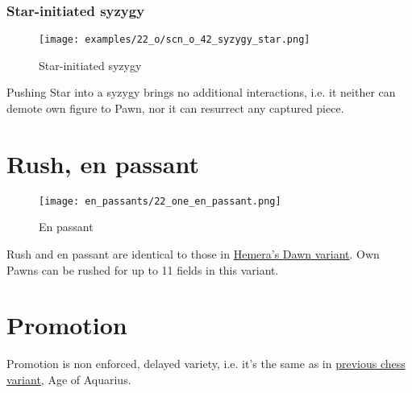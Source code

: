 \clearpage %

\subsubsection*{Star-initiated syzygy}
\label{sec:One/Starchild/Syzygy/Star-initiated syzygy}

\vspace*{-1.2\baselineskip}
\noindent
\begin{figure}[!h]
\texttt{[image: examples/22\_o/scn\_o\_42\_syzygy\_star.png]}
\caption{Star-initiated syzygy}
\label{fig:scn_o_42_syzygy_star}
\end{figure}

Pushing Star into a syzygy brings no additional interactions, i.e. it neither can
demote own figure to Pawn, nor it can resurrect any captured piece.

\clearpage %

\section*{Rush, en passant}
\label{sec:One/Rush, en passant}

\vspace*{-1.2\baselineskip}
\noindent
\begin{figure}[!h]
\texttt{[image: en\_passants/22\_one\_en\_passant.png]}
\caption{En passant}
\label{fig:22_one_en_passant}
\end{figure}

Rush and en passant are identical to those in
\hyperref[fig:14_hemera_s_dawn_en_passant]{Hemera's Dawn variant}.
Own Pawns can be rushed for up to 11 fields in this variant.

\clearpage %

\section*{Promotion}
\label{sec:One/Promotion}

Promotion is non enforced, delayed variety, i.e. it's the same as in
\hyperref[sec:Age of Aquarius/Promotion]{previous chess variant}, Age of Aquarius.

